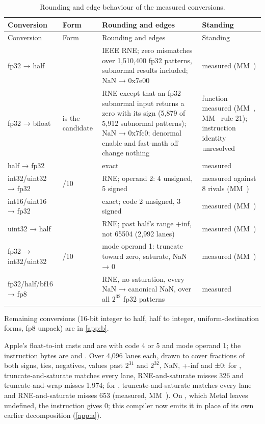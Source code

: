 \begin{xltabular}{\linewidth}{@{}>{\hsize}XX>{\hsize}X>{\hsize}X@{}}
\caption{Rounding and edge behaviour of the measured conversions.}\label{tab:conversions}\\
\toprule
Conversion & Form & Rounding and edges & Standing \\
\midrule
\endfirsthead
{}
\toprule
Conversion & Form & Rounding and edges & Standing \\
\midrule
\endhead
fp32 → half &  & IEEE RNE; zero mismatches over 1,510,400 fp32 patterns, subnormal
results included; NaN → 0x7e00 & measured (MM~) \\*
fp32 → bfloat &  is the candidate & RNE except that an fp32 subnormal input returns a zero with its sign
(5,879 of 5,912 subnormal patterns); NaN → 0x7fc0;
denormal enable and fast-math off change nothing & function measured (MM~, MM~ rule 21); instruction identity
unresolved \\*
half → fp32 &  & exact & measured \\*
int32/uint32 → fp32 & /10 & RNE; operand 2: 4 unsigned, 5 signed & measured against 8 rivals (MM~) \\*
int16/uint16 → fp32 &  & exact; code 2 unsigned, 3 signed & measured (MM~) \\*
uint32 → half &  & RNE; past half's range +inf, not 65504 (2,992
lanes) & measured (MM~) \\*
fp32 → int32/uint32 & /10 & mode operand 1: truncate toward zero, saturate, NaN → 0 & measured (MM~) \\*
fp32/half/bf16 → fp8 &  & RNE, no saturation, every NaN → canonical NaN, over all
$2^{32}$ fp32 patterns & measured \\*
\bottomrule
\end{xltabular}

Remaining conversions (16-bit integer to half, half to integer, uniform-destination forms, fp8 unpack) are in \cref{app:b}.

Apple's float-to-int casts  and  are  with code 4 or 5 and mode
operand 1; the instruction bytes are  and . Over 4,096 lanes each, drawn to
cover fractions of both signs, ties, negatives, values past $2^{31}$ and $2^{32}$, NaN, +-inf and ±0: for ,
truncate-and-saturate matches every lane, RNE-and-saturate misses 326 and truncate-and-wrap misses 1,974; for ,
truncate-and-saturate matches every lane and RNE-and-saturate misses 653 (measured, MM~). On , which
Metal leaves undefined, the instruction gives 0; this compiler now emits it in place of its own earlier decomposition
(\cref{app:a}).

